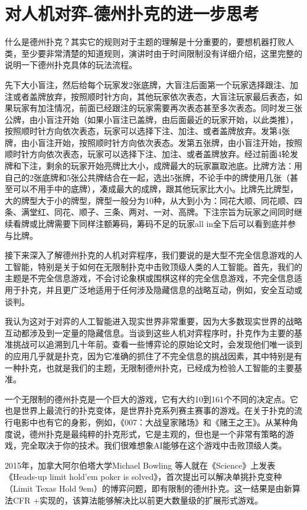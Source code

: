 \documentclass{article}
\begin{document}
\section{对人机对弈-德州扑克的进一步思考}
什么是德州扑克？其实它的规则对于主题的理解是十分重要的，要想机器打败人类，至少要非常清楚的知道规则，演讲时由于时间限制没有详细介绍，这里完整的说明一下德州扑克具体的玩法流程。\par
先下大小盲注，然后给每个玩家发2张底牌，大盲注后面第一个玩家选择跟注、加注或者盖牌放弃，按照顺时针方向，其他玩家依次表态，大盲注玩家最后表态，如果玩家有加注情况，前面已经跟注的玩家需要再次表态甚至多次表态。同时发三张公牌，由小盲注开始（如果小盲注已盖牌，由后面最近的玩家开始，以此类推），按照顺时针方向依次表态，玩家可以选择下注、加注、或者盖牌放弃。发第4张牌，由小盲注开始，按照顺时针方向依次表态。发第五张牌，由小盲注开始，按照顺时针方向依次表态，玩家可以选择下注、加注、或者盖牌放弃。经过前面4轮发牌和下注，剩余的玩家开始亮牌比大小，成牌最大的玩家赢取池底。比牌方法：用自己的2张底牌和5张公共牌结合在一起，选出5张牌，不论手中的牌使用几张（甚至可以不用手中的底牌），凑成最大的成牌，跟其他玩家比大小。比牌先比牌型，大的牌型大于小的牌型，牌型一般分为10种，从大到小为：同花大顺、同花顺、四条、满堂红、同花、顺子、三条、两对、一对、高牌。下注宗旨为玩家之间同时继续看牌或比牌需要下同样注额筹码，筹码不足的玩家all in全下后可以看到底并参与比牌。\par
接下来深入了解德州扑克的人机对弈程序，我们要说的是大型不完全信息游戏的人工智能，特别是关于如何在无限制扑克中击败顶级人类的人工智能。首先，我们的主题是不完全信息游戏，不会讨论象棋或围棋这样的完全信息游戏，不完全信息适用于扑克，并且更广泛地适用于任何涉及隐藏信息的战略互动，例如，安全互动或谈判。\par
我认为这对于对弈的人工智能进入现实世界非常重要，因为大多数现实世界的战略互动都涉及到一定量的隐藏信息。当谈到这些人机对弈程序时，扑克作为主要的基准挑战可以追溯到几十年前。查看一些博弈论的原始论文时，会发现他们唯一谈到的应用几乎就是扑克，因为它准确的抓住了不完全信息的挑战因素，其中特别是有一种扑克，也就是我们的主题，无限制德州扑克，已经成为检验人工智能的主要基准。\par
一个无限制的德州扑克是一个巨大的游戏，它有大约10到161个不同的决定点。它也是世界上最流行的扑克变体，是世界扑克系列赛主赛事的游戏。在关于扑克的流行电影中也有它的身影，例如，《007：大战皇家赌场》和《赌王之王》。从某种角度说，德州扑克是最纯粹的扑克形式，它是主观的，但也是一个非常有策略的游戏，完全取决于你的技术。我们很难想象AI能够在这个游戏中击败顶级人类。\par
2015年，加拿大阿尔伯塔大学Michael Bowling 等人就在《Science》上发表《Heads-up limit hold’em poker is solved》\citep{cc}，首次提出可以解决单挑扑克变种（Limit Texas Hold 9em）的博弈问题，即有限制的德州扑克。这一结果是由新算法CFR +实现的，该算法能够解决比以前更大数量级的扩展形式游戏。\par
\end{document}
